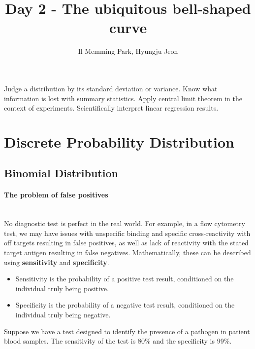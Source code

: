 \documentclass[a4paper,11pt]{exam}
\title{Day 2 - The ubiquitous bell-shaped curve}
\author{Il Memming Park, Hyungju Jeon}
\newcounter{ct}
\newcommand{\myparagraph}[1]{\paragraph{#1}\mbox{}\\}
\begin{document}
\maketitle
\begin{tcolorbox}[colback=black!1!,title=Learning Objective 2]
	Judge a distribution by its standard deviation or variance. Know what information is lost with summary statistics. Apply central limit theorem in the context of experiments. Scientifically interpret linear regression results.
\end{tcolorbox}
\section{Discrete Probability Distribution}
\subsection{Binomial Distribution}

\myparagraph{The problem of false positives} No diagnostic test is perfect in the real world.
For example, in a flow cytometry test, we may have issues with unspecific binding and specific cross-reactivity with off targets resulting in false positives, as well as lack of reactivity with the stated target antigen resulting in false negatives. Mathematically, these can be described using \textbf{sensitivity} and \textbf{specificity}.
\begin{itemize}
	\item Sensitivity is the probability of a positive test result, conditioned on the individual truly being positive.
	\item Specificity is the probability of a negative test result, conditioned on the individual truly being negative.
\end{itemize}

Suppose we have a test designed to identify the presence of a pathogen in patient blood samples. The sensitivity of the test is 80\% and the specificity is 99\%.
\end{document}
